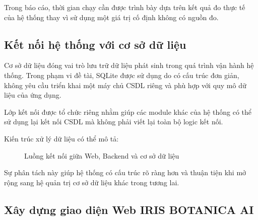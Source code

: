 \documentclass[14pt]{extarticle}
\begin{document}
	\noindent Trong báo cáo, thời gian chạy cần được trình bày dựa trên kết quả đo thực tế của hệ thống thay vì sử dụng một giá trị cố định không có nguồn đo.
	
	\subsection{Kết nối hệ thống với cơ sở dữ liệu}
	
	\noindent Cơ sở dữ liệu đóng vai trò lưu trữ dữ liệu phát sinh trong quá trình vận hành hệ thống. Trong phạm vi đề tài, SQLite được sử dụng do có cấu trúc đơn giản, không yêu cầu triển khai một máy chủ CSDL riêng và phù hợp với quy mô dữ liệu của ứng dụng.
	
	\noindent Lớp kết nối được tổ chức riêng nhằm giúp các module khác của hệ thống có thể sử dụng lại kết nối CSDL mà không phải viết lại toàn bộ logic kết nối.
	
	\noindent Kiến trúc xử lý dữ liệu có thể mô tả:
	
	\begin{figure}[htbp]
		\centering
		\caption{Luồng kết nối giữa Web, Backend và cơ sở dữ liệu}
		\label{fig:database-flow}
	\end{figure}
	
	
	
	\noindent Sự phân tách này giúp hệ thống có cấu trúc rõ ràng hơn và thuận tiện khi mở rộng sang hệ quản trị cơ sở dữ liệu khác trong tương lai.
	
	\subsection{Xây dựng giao diện Web IRIS BOTANICA AI}
	
\end{document}
